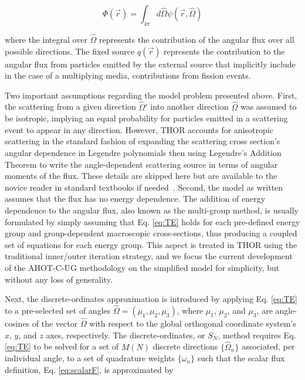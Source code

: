 \begin{equation} \label{eq:scalarF}
    \Phi ( \Vec{r} ) = \int _{4 \pi} d \hat{\Omega } \psi ( \Vec{r} , \hat{\Omega } )
\end{equation}

\noindent where the integral over $\hat{\Omega }$ represents the contribution of the angular flux over all possible directions.
The fixed source $ q ( \Vec{r} )$ represents the contribution to the angular flux from particles emitted by the external source that implicitly include in the case of a multiplying media, contributions from fission events.

Two important assumptions regarding the model problem presented above.
First, the scattering from a given direction $\hat{\Omega} ' $ into another direction $\hat{\Omega}$ was assumed to be isotropic, implying an equal probability for particles emitted in a scattering event to appear in any direction.
However, \ac{THOR} accounts for anisotropic scattering in the standard fashion of expanding the scattering cross section's angular dependence in Legendre polynomials then using Legendre's Addition Theorem to write the angle-dependent scattering source in terms of angular moments of the flux.
These details are skipped here but are available to the novice reader in standard textbooks if needed~\cite{Lewis1993}.
Second, the model as written assumes that the flux has no energy dependence.
The addition of energy dependence to the angular flux, also known as the multi-group method, is usually formulated by simply assuming that Eq. \ref{eq:TE} holds for each pre-defined energy group and group-dependent macroscopic cross-sections, thus producing a coupled set of equations for each energy group.
This aspect is treated in \ac{THOR} using the traditional inner/outer iteration strategy, and we focus the current development of the \ac{AHOT-C-UG} methodology on the simplified model for simplicity, but without any loss of generality.

Next, the discrete-ordinates approximation is introduced by applying Eq. \ref{eq:TE} to a pre-selected set of angles $\hat{\Omega} = ( \mu_1 , \mu_2 , \mu_3 )$, where $\mu_1$, $\mu_2$, and $\mu_3$, are angle-cosines of the vector $\hat{\Omega}$ with respect to the global orthogonal coordinate
system's $x$, $y$, and $z$ axes, respectively.
The discrete-ordinates, or $S_N$, method requires Eq. \ref{eq:TE} to be solved for a set of $M(N)$ discrete directions $\{ \hat{\Omega} _n \}$ associated, per individual angle, to a set of quadrature weights $\{ \omega_n \}$ such that the scalar flux definition, Eq. \ref{eq:scalarF}, is approximated by

